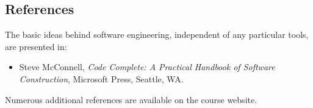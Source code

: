\subsection*{References}\vspace{0.5cm}
The basic ideas behind software engineering, independent of any particular tools, are presented in:
%
\begin{itemize}
\item Steve McConnell, \textit{Code Complete: A Practical Handbook of Software Construction}, Microsoft Press, Seattle, WA.
\end{itemize}
%
\noindent Numerous additional references are available on the course website.
